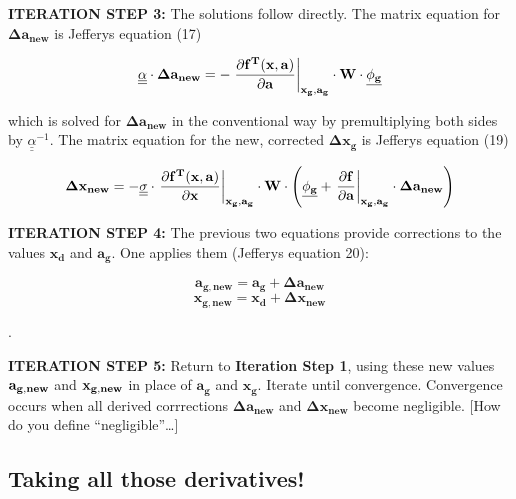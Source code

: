 \documentclass[psfig,preprint]{aastex}
\begin{document}
{\large \bf ITERATION STEP 3:} The solutions follow directly. The
matrix equation for $\mathbf{\Delta a_{new}}$ is Jefferys equation (17)

\begin{equation}
\mathbf{ \underline{\underline{\alpha}} \cdot \Delta a_{new} = 
- \left.{\partial f^T(x, a) \over \partial a}\right|_{x_g, a_g}
\cdot W \cdot \underline{\phi_g} }
\end{equation}

\noindent which is solved for $\mathbf{\Delta a_{new}}$ in the conventional
way by premultiplying both sides by
$\underline{\underline{\alpha}}^{-1}$.  The matrix equation for the new,
corrected $\mathbf{\Delta x_g}$ is Jefferys equation (19)

\begin{equation}
\mathbf{ \Delta x_{new} = -\underline{\underline{\sigma}} \cdot
 \left.{\partial f^T(x, a) \over 
  \partial x}\right|_{x_g,a_g} \cdot W \cdot 
\left( \underline{\phi_g} + \left. {\partial f \over \partial a}\right|_{x_g,a_g} 
\cdot \Delta a_{new} \right)  }
\end{equation}

{\large \bf ITERATION STEP 4:} The previous two equations provide
corrections to the values $\mathbf{x_d}$ and $\mathbf{a_g}$. One applies
them (Jefferys equation 20):

\begin{mathletters}
\begin{equation}
\mathbf{ a_{g, new} = a_g + \Delta a_{new}}
\end{equation}
\begin{equation}
\mathbf{ x_{g, new} = x_d + \Delta x_{new} }
\end{equation}
\end{mathletters}

. 

{\large \bf ITERATION STEP 5:} Return to {\bf Iteration Step 1}, using
these new values $\bf a_{g,new}$ and $\bf x_{g,new}$ in place of
$\mathbf{a_g}$ and $\mathbf {x_g}$. Iterate until convergence. Convergence
occurs when all derived corrrections $\mathbf {\Delta a_{new}}$ and
$\mathbf {\Delta x_{new}}$ become negligible. [How do you define
``negligible''\dots]


\subsection{Taking all those derivatives!}
\end{document}
